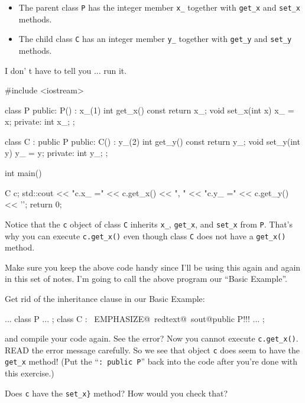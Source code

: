 \begin{itemize}
\item
  The parent class \texttt{P} has the integer member \verb!x_! together
  with \verb!get_x! and \verb!set_x! methods.
\item
  The child class \texttt{C} has an integer member \verb!y_! together
  with \verb!get_y! and \verb!set_y! methods.
\end{itemize}

I don' t have to tell you ... run it.
\begin{console}
#include <iostream>

class P
{
public:
        P() : x_(1) {}
        int get_x() const { return x_; }
        void set_x(int x) { x_ = x; }
private:
        int x_;
};

class C : public P
{
public:
        C() : y_(2) {}
        int get_y() const { return y_; }
        void set_y(int y) { y_ = y; }
private:
        int y_;
};

int main()
{   
    C c;
    std::cout << "c.x_ =" << c.get_x() << ", "
              << "c.y_ =" << c.get_y() << '\n';
return 0;

} 
\end{console}

Notice that the \texttt{c} object of class \texttt{C} inherits \verb!x_!,
\verb!get_x!, and \verb!set_x! from \texttt{P}. That's why you can
execute \verb!c.get_x()! even though class \texttt{C} does not have a
\verb!get_x()! method.

Make sure you keep the above code handy since I'll be using this again
and again in this set of notes. I'm going to call the above program our
``Basic Example''.

\begin{ex} Get rid of the inheritance clause in our Basic Example:
\begin{console}[commandchars=\~\@\!]
...
class P
{
      ...
};
class C : ~EMPHASIZE@~redtext@~sout@public P!!!
{     
      ...
};
\end{console}
and compile your code again. See the error? Now you cannot execute \verb!c.get_x()!. READ the error message carefully. So we see that object \verb!c! does seem to have the \verb!get_x! method! (Put the ``\verb!: public P!'' back into the code after you're done with this exercise.)
\end{ex}

\begin{ex} Does \verb!c! have the \verb!set_x}! method? How
would you check that?
\end{ex}


